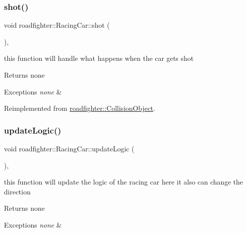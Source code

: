 \subsubsection{\texorpdfstring{shot()}{shot()}}
{\footnotesize\ttfamily void roadfighter\+::\+Racing\+Car\+::shot (\begin{DoxyParamCaption}{ }\end{DoxyParamCaption})\hspace{0.3cm}{\ttfamily [override]}, {\ttfamily [virtual]}}

this function will handle what happens when the car gets shot \begin{DoxyReturn}{Returns}
none 
\end{DoxyReturn}

\begin{DoxyExceptions}{Exceptions}
{\em none} & \\
\hline
\end{DoxyExceptions}


Reimplemented from \hyperlink{classroadfighter_1_1CollisionObject_a55d891b6d9b50abdc44f964a40a7777c}{roadfighter\+::\+Collision\+Object}.

\mbox{\label{classroadfighter_1_1RacingCar_af3f3b4c368ba61c13dc9b99004895c5d}} 
\subsubsection{\texorpdfstring{update\+Logic()}{updateLogic()}}
{\footnotesize\ttfamily void roadfighter\+::\+Racing\+Car\+::update\+Logic (\begin{DoxyParamCaption}{ }\end{DoxyParamCaption})\hspace{0.3cm}{\ttfamily [override]}, {\ttfamily [virtual]}}

this function will update the logic of the racing car here it also can change the direction \begin{DoxyReturn}{Returns}
none 
\end{DoxyReturn}

\begin{DoxyExceptions}{Exceptions}
{\em none} & \\
\hline
\end{DoxyExceptions}


